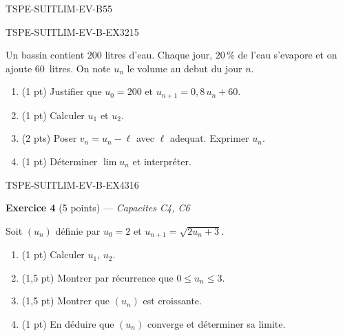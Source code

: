 \begin{evaluation}{TSPE-SUITLIM-EV-B}{55}
\begin{exercice}{TSPE-SUITLIM-EV-B-EX3}{2}{15}
\medskip

Un bassin contient $200$ litres d'eau. Chaque jour, $20\,\%$ de l'eau s'evapore et on ajoute $60$~litres. On note $u_n$ le volume au debut du jour $n$.

\begin{enumerate}
  \item (1 pt) Justifier que $u_0 = 200$ et $u_{n+1} = 0{,}8\,u_n + 60$.
  \item (1 pt) Calculer $u_1$ et $u_2$.
  \item (2 pts) Poser $v_n = u_n - \ell$ avec $\ell$ adequat. Exprimer $u_n$.
  \item (1 pt) Déterminer $\lim u_n$ et interpréter.
\end{enumerate}

\end{exercice}


\begin{exercice}{TSPE-SUITLIM-EV-B-EX4}{3}{16}

\textbf{Exercice 4} (5 points) — \textit{Capacites C4, C6}

\medskip

Soit $(u_n)$ définie par $u_0 = 2$ et $u_{n+1} = \sqrt{2u_n + 3}$.

\begin{enumerate}
  \item (1 pt) Calculer $u_1$, $u_2$.
  \item (1,5 pt) Montrer par récurrence que $0 \leq u_n \leq 3$.
  \item (1,5 pt) Montrer que $(u_n)$ est croissante.
  \item (1 pt) En déduire que $(u_n)$ converge et déterminer sa limite.
\end{enumerate}

\end{exercice}

\end{evaluation}
